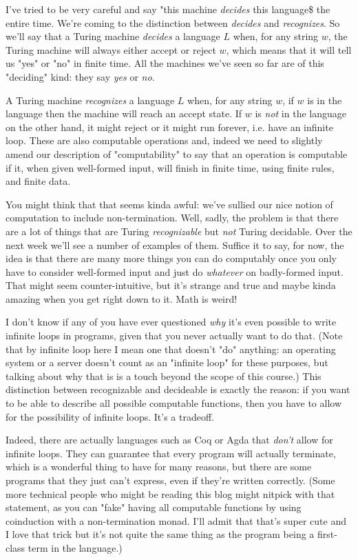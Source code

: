 \documentclass[11pt]{article}
\begin{document}
I've tried to be very careful and say "this machine \emph{decides} this language\$ the entire time. We're coming to the distinction between \emph{decides} and \emph{recognizes}. So we'll say that a Turing machine \emph{decides} a language $L$ when, for any string $w$, the Turing machine will always either accept or reject $w$, which means that it will tell us "yes" or "no" in finite time. All the machines we've seen so far are of this "deciding" kind: they say \emph{yes} or \emph{no}. 

A Turing machine \emph{recognizes} a language $L$ when, for any string $w$, if $w$ is in the language then the machine will reach an accept state. If $w$ is \emph{not} in the language on the other hand, it might reject or it might run forever, i.e. have an infinite loop. These are also computable operations and, indeed we need to slightly amend our description of "computability" to say that an operation is computable if it, when given well-formed input, will finish in finite time, using finite rules, and finite data.

You might think that that seems kinda awful: we've sullied our nice notion of computation to include non-termination. Well, sadly, the problem is that there are a lot of things that are Turing \emph{recognizable} but \emph{not} Turing decidable. Over the next week we'll see a number of examples of them. Suffice it to say, for now, the idea is that there are many more things you can do computably once you only have to consider well-formed input and just do \emph{whatever} on badly-formed input. That might seem counter-intuitive, but it's strange and true and maybe kinda amazing when you get right down to it. Math is weird!

I don't know if any of you have ever questioned \emph{why} it's even possible to write infinite loops in programs, given that you never actually want to do that. (Note that by infinite loop here I mean one that doesn't "do" anything: an operating system or a server doesn't count as an "infinite loop" for these purposes, but talking about why that is is a touch beyond the scope of this course.) This distinction between recognizable and decideable is exactly the reason: if you want to be able to describe all possible computable functions, then you have to allow for the possibility of infinite loops. It's a tradeoff. 

Indeed, there are actually languages such as Coq or Agda that \emph{don't} allow for infinite loops. They can guarantee that every program will actually terminate, which is a wonderful thing to have for many reasons, but there are some programs that they just can't express, even if they're written correctly. (Some more technical people who might be reading this blog might nitpick with that statement, as you can "fake" having all computable functions by using coinduction with a non-termination monad. I'll admit that that's super cute and I love that trick but it's not quite the same thing as the program being a first-class term in the language.)
\end{document}
